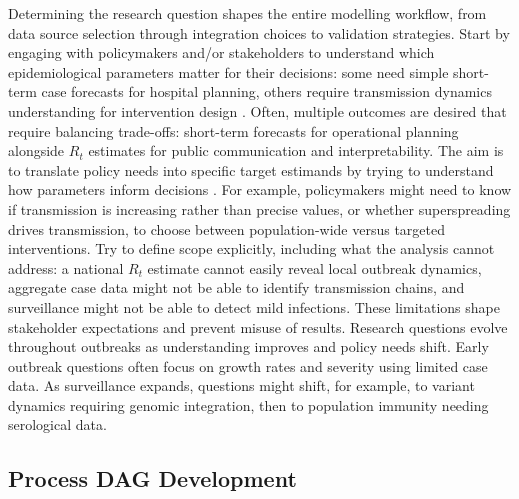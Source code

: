 \documentclass{article}
\begin{document}
Determining the research question shapes the entire modelling workflow, from data source selection through integration choices to validation strategies.
Start by engaging with policymakers and/or stakeholders to understand which epidemiological parameters matter for their decisions: some need simple short-term case forecasts for hospital planning, others require transmission dynamics understanding for intervention design \citep{marshall2024when}.
Often, multiple outcomes are desired that require balancing trade-offs: short-term forecasts for operational planning alongside $R_t$ estimates for public communication and interpretability.
The aim is to translate policy needs into specific target estimands by trying to understand how parameters inform decisions \citep{nicholson2022interoperability}.
For example, policymakers might need to know if transmission is increasing rather than precise values, or whether superspreading drives transmission, to choose between population-wide versus targeted interventions.
Try to define scope explicitly, including what the analysis cannot address: a national $R_t$ estimate cannot easily reveal local outbreak dynamics, aggregate case data might not be able to identify transmission chains, and surveillance might not be able to detect mild infections.
These limitations shape stakeholder expectations and prevent misuse of results.
Research questions evolve throughout outbreaks as understanding improves and policy needs shift.
Early outbreak questions often focus on growth rates and severity using limited case data.
As surveillance expands, questions might shift, for example, to variant dynamics requiring genomic integration, then to population immunity needing serological data.

\subsection{Process DAG Development} \label{sec:process}
\end{document}
